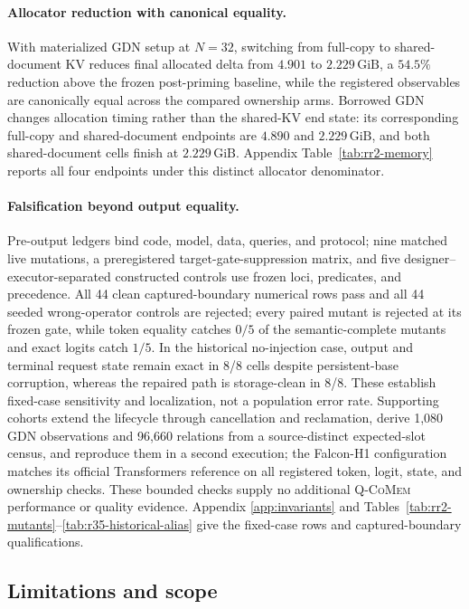 \documentclass{article}
\newcommand{\qcomem}{\textsc{Q-CoMem}}
\newcommand{\gib}{\,\mathrm{GiB}}
\begin{document}
\paragraph{Allocator reduction with canonical equality.}
With materialized GDN setup at $N=32$, switching from full-copy to
shared-document KV reduces final allocated delta from $4.901$ to $2.229\gib$,
a $54.5\%$ reduction above the frozen post-priming baseline, while the
registered observables are canonically equal across the compared ownership
arms.  Borrowed GDN changes allocation timing rather than the shared-KV end
state: its corresponding full-copy and shared-document endpoints are $4.890$ and
$2.229\gib$, and both shared-document cells finish at $2.229\gib$.  Appendix
Table~\ref{tab:rr2-memory} reports all four endpoints under this distinct
allocator denominator.

\paragraph{Falsification beyond output equality.}
Pre-output ledgers bind code, model, data, queries, and protocol; nine matched
live mutations, a preregistered target-gate-suppression matrix, and five
designer--executor-separated constructed controls use frozen loci, predicates,
and precedence.  All 44 clean captured-boundary numerical rows pass and all 44
seeded wrong-operator controls are rejected; every paired mutant is rejected at
its frozen gate, while token equality catches $0/5$ of the semantic-complete
mutants and exact logits catch $1/5$.  In the historical no-injection case,
output and terminal request state remain exact in 8/8 cells despite
persistent-base corruption, whereas the repaired path is storage-clean in 8/8.
These establish fixed-case sensitivity and localization, not a population error
rate.  Supporting cohorts extend the lifecycle through cancellation and
reclamation, derive 1,080 GDN observations and 96,660 relations from a
source-distinct expected-slot census, and reproduce them in a second execution;
the Falcon-H1 configuration matches its official Transformers reference on all
registered token, logit, state, and ownership checks.  These bounded checks
supply no additional \qcomem{} performance or quality evidence.  Appendix
\ref{app:invariants} and Tables~\ref{tab:rr2-mutants}--\ref{tab:r35-historical-alias}
give the fixed-case rows and captured-boundary qualifications.

\subsection{Limitations and scope}
\label{sec:limitations}
\end{document}
